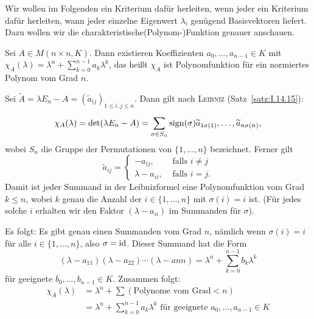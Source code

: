 Wir wollen im Folgenden ein Kriterium dafür herleiten, wenn jeder ein Kriterium dafür herleiten, wann jeder einzelne Eigenwert $\lambda_i$ genügend Basisvektoren liefert.
Dazu wollen wir die charakteristische\linebreak (Polynom-)Funktion genauer anschauen.

\begin{satz}
	\label{satz:2.1}
	Sei $A \in M(n \times n,K)$.
	Dann existieren Koeffizienten $a_0, \dots,a_{n-1} \in K$ mit $\chi_A(\lambda) = \lambda^n + \sum_{k=0}^{n-1} a_k \lambda^k$, das heißt $\chi_A$ ist Polynomfunktion für ein normiertes Polynom vom Grad $n$.
\end{satz}

\begin{beweis}
	Sei $\widetilde{A}	 = \lambda E_n - A = (\widetilde{a}_{ij})_{1 \leq i,j \leq n}$.
	Dann gilt nach \textsc{Leibniz} (Satz~\ref{satz:I.14.15}):
	\[
		\chi_A(\lambda) = \det(\lambda E_n - A) = \sum_{\sigma \in S_n}^{} \operatorname{sign}(\sigma) \widetilde{a}_{1 \sigma(1)},\dots,\widetilde{a}_{n \sigma (n)},
	\]
	wobei $S_n$ die Gruppe der Permutationen von $\{1,\dots,n\}$ bezeichnet.
	Ferner gilt
	\[
		\widetilde{a}_{ij} = \begin{cases}
			-a_{ij}, & \text{ falls } i \neq j \\
			\lambda - a_{ii}, & \text{ falls } i = j.
		\end{cases}
	\]
	Damit ist jeder Summand in der Leibnizformel eine Polynomfunktion vom Grad $k \leq n$, wobei $k$ genau die Anzahl der $i \in \{1,\dots,n\}$ mit $\sigma(i) = i$ ist.
	(Für jedes solche $i$ erhalten wir den Faktor $(\lambda - a_{ii})$ im Summanden für $\sigma$).
	
	Es folgt: Es gibt genau einen Summanden vom Grad $n$, nämlich wenn $\sigma(i) = i$ für alle $i \in \{1,\dots,n\}$, also $\sigma=\operatorname{id}$.
	Dieser Summand hat die Form
	\[
		(\lambda - a_{11})(\lambda-a_{22}) \cdots (\lambda-a{nn}) = \lambda^n + \sum_{k=0}^{n-1} b_k \lambda^k
	\]
	für geeignete $b_0,\dots,b_{n-1} \in K$.
	Zusammen folgt:
	\begin{align*}
		\chi_A(\lambda) &= \lambda^n + \sum (\text{Polynome vom Grad} < n) \\
		&= \lambda^n + \sum_{k=0}^{n-1} a_k \lambda^k \text{ für geeignete } a_0,\dots,a_{n-1} \in K 
	\end{align*}
\end{beweis}

